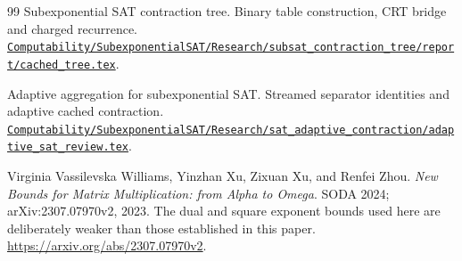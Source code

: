 \begin{thebibliography}{99}
 Subexponential SAT contraction tree. Binary table construction, CRT bridge and charged recurrence.
\href{https://github.com/VladimirReshetnikov/ProveIt/blob/dde01c4a63b822c25b8eb345299346c36f837b49/Computability/SubexponentialSAT/Research/subsat_contraction_tree/report/cached_tree.tex}{\nolinkurl{Computability/SubexponentialSAT/Research/subsat_contraction_tree/report/cached_tree.tex}}.

 Adaptive aggregation for subexponential SAT. Streamed separator identities and adaptive cached contraction.
\href{https://github.com/VladimirReshetnikov/ProveIt/blob/dde01c4a63b822c25b8eb345299346c36f837b49/Computability/SubexponentialSAT/Research/sat_adaptive_contraction/adaptive_sat_review.tex}{\nolinkurl{Computability/SubexponentialSAT/Research/sat_adaptive_contraction/adaptive_sat_review.tex}}.

 Virginia Vassilevska Williams, Yinzhan Xu, Zixuan Xu, and Renfei Zhou. \emph{New Bounds for Matrix Multiplication: from Alpha to Omega}. SODA 2024; arXiv:2307.07970v2, 2023. The dual and square exponent bounds used here are deliberately weaker than those established in this paper. \url{https://arxiv.org/abs/2307.07970v2}.

\end{thebibliography}
